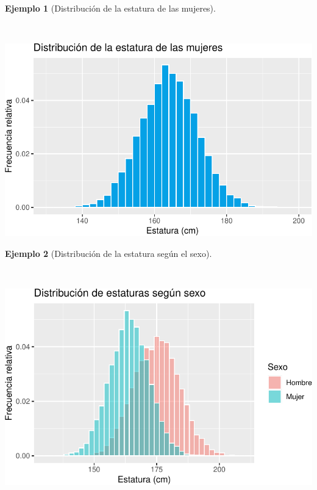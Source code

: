 \documentclass[
  a4paper,
]{scrreport}
\theoremstyle{plain}
\theoremstyle{definition}
\theoremstyle{definition}
\newtheorem{example}{Ejemplo}[chapter]
\theoremstyle{remark}
\begin{document}
\begin{example}[Distribución de la estatura de las
mujeres]\protect\hypertarget{exm-distribucion-estatura-mujeres}{}\label{exm-distribucion-estatura-mujeres}

~

\includegraphics{02-estadistica-descriptiva_files/figure-pdf/histograma-estatura-mujeres-1.pdf}

\end{example}

\begin{example}[Distribución de la estatura según el
sexo]\protect\hypertarget{exm-distribucion-estaturas-sexo}{}\label{exm-distribucion-estaturas-sexo}

~

\includegraphics{02-estadistica-descriptiva_files/figure-pdf/histograma-estatura-sexo-1.pdf}

\end{example}
\end{document}
